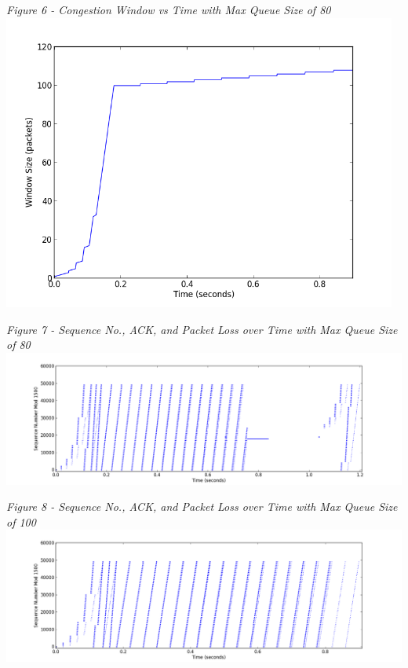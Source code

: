 \documentclass[11pt]{article}
\begin{document}
\textit{Figure 6 - Congestion Window vs Time with Max Queue Size of 80}
\\
\includegraphics[width=13cm]{1_data/1-window_q100}
\vspace{0.25cm}

\textit{Figure 7 - Sequence No., ACK, and Packet Loss over Time with Max Queue Size of 80}
\\
\includegraphics[width=18cm]{1_data/1-sequence_q80}
\vspace{0.25cm}

\textit{Figure 8 - Sequence No., ACK, and Packet Loss over Time with Max Queue Size of 100}
\\
\includegraphics[width=18cm]{1_data/1-sequence_q100}
\vspace{0.25cm}
\end{document}
